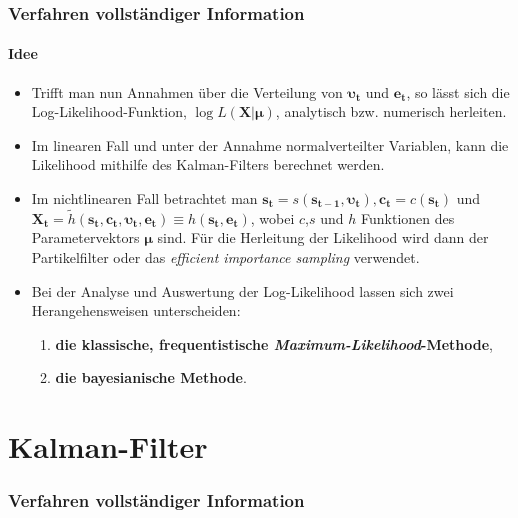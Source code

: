 \documentclass{beamer} %
\begin{document}
\begin{frame}\frametitle{Verfahren vollst\"{a}ndiger Information}\framesubtitle{Idee}
  \begin{itemize}
    \item Trifft man nun Annahmen \"{u}ber die Verteilung von $\boldsymbol{\upsilon_t}$ und $\mathbf{e_t}$, so l\"{a}sst sich die Log-Likelihood-Funktion, $\log{L(\mathbf{X}|\boldsymbol{\mu})}$, analytisch bzw. numerisch herleiten.
    \item Im linearen Fall und unter der Annahme normalverteilter Variablen, kann die Likelihood mithilfe des Kalman-Filters berechnet werden.
    \item Im nichtlinearen Fall betrachtet man $\mathbf{s_t}=s(\mathbf{s_{t-1}},\boldsymbol{\upsilon_t}), \mathbf{c_t} = c(\mathbf{s_t})$ und $\mathbf{X_t} =\widetilde{h}(\mathbf{s_t},\mathbf{c_t},\boldsymbol{\upsilon_t}, \mathbf{e_t})\equiv h(\mathbf{s_t},\mathbf{e_t})$, wobei $c$,$s$ und $h$ Funktionen des Parametervektors $\boldsymbol{\mu}$ sind. F\"{u}r die Herleitung der Likelihood wird dann der Partikelfilter oder das \emph{efficient importance sampling} verwendet.
    \item Bei der Analyse und Auswertung der Log-Likelihood lassen sich zwei Herangehensweisen unterscheiden:
    \begin{enumerate}
      \item \textbf{die klassische, frequentistische \emph{Maximum-Likelihood}-Methode},
      \item \textbf{die bayesianische Methode}.
    \end{enumerate}
  \end{itemize}
\end{frame}

\section{Kalman-Filter}
\begin{frame}\frametitle{Verfahren vollst\"{a}ndiger Information}
  \tableofcontents[currentsection]
\end{frame}
\end{document}
